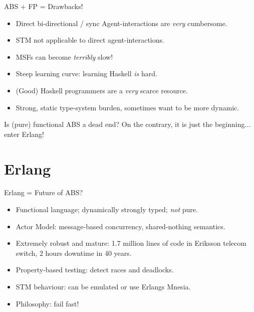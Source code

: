 \documentclass{beamer} %
\begin{document}
\begin{frame}{ABS + FP = Drawbacks!}
  \begin{itemize}
    \item Direct bi-directional / sync Agent-interactions are \textit{very} cumbersome.
    \item STM not applicable to direct agent-interactions.
    \item MSFs can become \textit{terribly} slow!
    \item Steep learning curve: learning Haskell \textit{is} hard.
    \item (Good) Haskell programmers are a \textit{very} scarce resource.
    \item Strong, static type-system burden, sometimes want to be more dynamic.
  \end{itemize}
  
  \begin{block}{Is (pure) functional ABS a dead end?}
    On the contrary, it is just the beginning... enter Erlang!
  \end{block}
\end{frame}

\section{Erlang}

\begin{frame}{Erlang = Future of ABS?}
  \begin{itemize}
    \item Functional language; dynamically strongly typed; \textit{not} pure.
    \item Actor Model: message-based concurrency, shared-nothing semantics.
    \item Extremely robust and mature: 1.7 million lines of code in Eriksson telecom switch, 2 hours downtime in 40 years.
    \item Property-based testing: detect races and deadlocks.
    \item STM behaviour: can be emulated or use Erlangs Mnesia.
    \item Philosophy: fail fast! %
  \end{itemize}
\end{frame}
\end{document}
